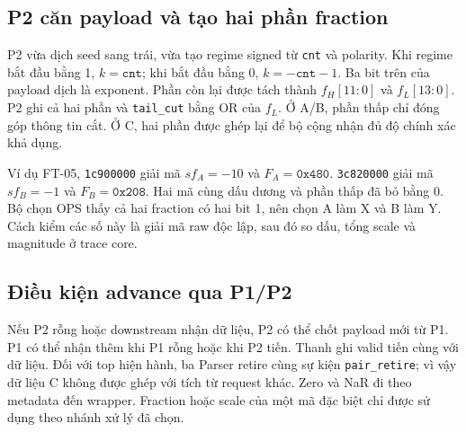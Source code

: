 


\subsection{P2 căn payload và tạo hai phần fraction}

P2 vừa dịch seed sang trái, vừa tạo regime signed từ \texttt{cnt}
và polarity. Khi regime bắt đầu bằng 1, $k=\texttt{cnt}$; khi bắt
đầu bằng 0, $k=-\texttt{cnt}-1$. Ba bit trên của payload dịch là
exponent. Phần còn lại được tách thành $f_H[11:0]$ và $f_L[13:0]$.
P2 ghi cả hai phần và \texttt{tail\_cut} bằng OR của $f_L$.
Ở A/B, phần thấp chỉ đóng góp thông tin cắt. Ở C, hai phần được
ghép lại để bộ cộng nhận đủ độ chính xác khả dụng.

Ví dụ FT-05, \texttt{1c900000} giải mã $sf_A=-10$ và
$F_A=\texttt{0x480}$. \texttt{3c820000} giải mã $sf_B=-1$
và $F_B=\texttt{0x208}$. Hai mã cùng dấu dương và phần thấp đã
bỏ bằng 0. Bộ chọn OPS thấy cả hai fraction có hai bit 1, nên
chọn A làm X và B làm Y. Cách kiểm các số này là giải mã raw
độc lập, sau đó so dấu, tổng scale và magnitude ở trace core.

\subsection{Điều kiện advance qua P1/P2}

Nếu P2 rỗng hoặc downstream nhận dữ liệu, P2 có thể chốt payload
mới từ P1. P1 có thể nhận thêm khi P1 rỗng hoặc khi P2 tiến.
Thanh ghi valid tiến cùng với dữ liệu. Đối với top hiện hành,
ba Parser retire cùng sự kiện \texttt{pair\_retire}; vì vậy
dữ liệu C không được ghép với tích từ request khác. Zero và NaR
đi theo metadata đến wrapper. Fraction hoặc scale của một mã
đặc biệt chỉ được sử dụng theo nhánh xử lý đã chọn.
